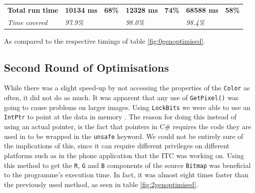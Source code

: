 \begin{table}[H]
\begin{tabular}{@{}lllllll@{}}
        \textbf{Total run time} & \textbf{10134 ms}                                                                         & \textbf{68\%}                                                                  & \textbf{12328 ms}                                                                          & \textbf{74\%}                                                                 & \textbf{68588 ms}                                                                       & \textbf{58\%}                                                                 \\
        \textit{Time covered}   & \textit{97.9\%}                                                                           & \textit{}                                                                      & \textit{98.0\%}                                                                            &                                                                               & \textit{98.4\%}                                                                         & \textit{}                                                                     \\ \bottomrule
    \end{tabular}
    \begin{tablenotes}
        \footnotesize{\item \textdagger As compared to the respective timings of table \ref{fig:0genoptimised}.}
    \end{tablenotes}
\end{table}

\subsection{Second Round of Optimisations}
While there was a slight speed-up by not accessing the properties of the \lstinline|Color| as often, it did not do as much.
It was apparent that any use of \lstinline|GetPixel()| was going to cause problems on larger images.
Using \lstinline|LockBits| we were able to use an \lstinline|IntPtr| to point at the data in memory \citep{MSDNIntPtr}.
The reason for doing this instead of using an actual pointer, is the fact that pointers in C\# requires the code they are used in to be wrapped in the \lstinline|unsafe| keyword. 
We could not be entirely sure of the implications of this, since it can require different privileges on different platforms such as in the phone application that the ITC was working on.
Using this method to get the \lstinline|R|, \lstinline|G| and \lstinline|B| components of the source \lstinline|Bitmap| was beneficial to the programme's execution time.
In fact, it was almost eight times faster than the previously used method, as seen in table \ref{fig:2genoptimised}.

